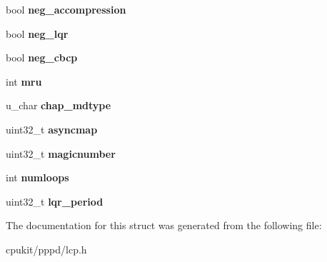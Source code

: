 \begin{DoxyCompactItemize}
bool {\bfseries neg\+\_\+accompression}
\item 
\mbox{\label{structlcp__options_a04a1028fe945723b0ca0c81eb2b2f72f}} 
bool {\bfseries neg\+\_\+lqr}
\item 
\mbox{\label{structlcp__options_ad4dc335e9d94787e50260855ccf88bbf}} 
bool {\bfseries neg\+\_\+cbcp}
\item 
\mbox{\label{structlcp__options_af38948c700eed91667e955b861965211}} 
int {\bfseries mru}
\item 
\mbox{\label{structlcp__options_aad8812bc646bf71946e7a2dbae0e21d5}} 
u\+\_\+char {\bfseries chap\+\_\+mdtype}
\item 
\mbox{\label{structlcp__options_abcc6abd3eac9bc8e07b5cc3aeb30c79f}} 
uint32\+\_\+t {\bfseries asyncmap}
\item 
\mbox{\label{structlcp__options_acdbb2061a3a206dc0043de1f0c0f7ce9}} 
uint32\+\_\+t {\bfseries magicnumber}
\item 
\mbox{\label{structlcp__options_a2dc6fa9a49ce366d061d21e05df8eb66}} 
int {\bfseries numloops}
\item 
\mbox{\label{structlcp__options_a7e903fdda6baa31b0b7c5a5250be2ffd}} 
uint32\+\_\+t {\bfseries lqr\+\_\+period}
\end{DoxyCompactItemize}


The documentation for this struct was generated from the following file\+:\begin{DoxyCompactItemize}
\item 
cpukit/pppd/lcp.\+h\end{DoxyCompactItemize}
